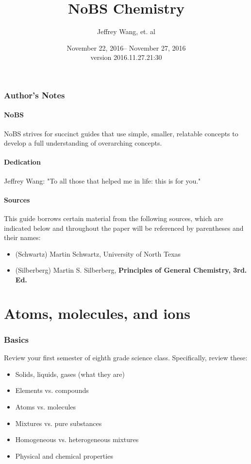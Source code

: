 \documentclass[letterpaper, 12pt]{article}
\begin{document}
\title{NoBS Chemistry}
\author{Jeffrey Wang, et. al}
\date{November 22, 2016-- November 27, 2016\\version 2016.11.27.21:30}
\maketitle


\setcounter{secnumdepth}{1}
\setcounter{section}{0}


\tableofcontents
\clearpage

\section*{Author's Notes}
	\subsection{NoBS}
	NoBS strives for succinct guides that use simple, smaller, relatable concepts to develop a full understanding of overarching concepts.
	\subsection{Dedication}
	Jeffrey Wang: "To all those that helped me in life: this is for you."
	\subsection{Sources}
	This guide borrows certain material from the following sources, which are indicated below and throughout the paper will be referenced by parentheses and their names:
	\begin{itemize}
		\item (Schwartz) Martin Schwartz, University of North Texas
		\item (Silberberg) Martin S. Silberberg,  \textbf{Principles of General Chemistry, 3rd. Ed.}
	\end{itemize}
\clearpage


\clearpage

\part{Atoms, molecules, and ions}

\section{Basics}
Review your first semester of eighth grade science class. Specifically, review these:
\begin{itemize}
	\item Solids, liquids, gases (what they are)
	\item Elements vs. compounds
	\item Atoms vs. molecules
	\item Mixtures vs. pure substances
	\item Homogeneous vs. heterogeneous mixtures
	\item Physical and chemical properties
\end{itemize}
\end{document}
